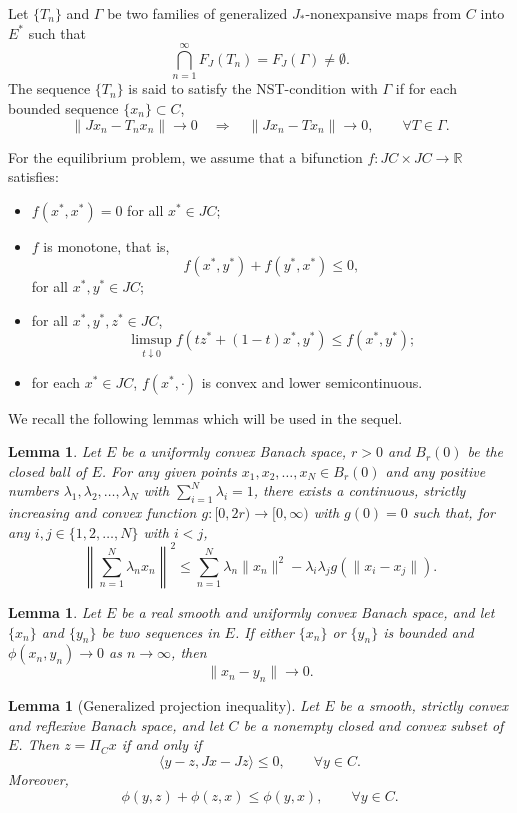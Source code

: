 \documentclass[leqno,12pt]{amsart}
\newtheorem{lemma}[theorem]{Lemma}
\theoremstyle{definition}
\numberwithin{equation}{section}
\begin{document}
 Let $\{T_n\}$ and $\Gamma$ be two families of generalized $J_{*}$-nonexpansive maps from $C$ into $E^{*}$ such that
\[
\bigcap_{n=1}^{\infty}F_J(T_n)=F_J(\Gamma)\neq\emptyset.
\]
The sequence $\{T_n\}$ is said to satisfy the NST-condition with $\Gamma$ if for each bounded sequence $\{x_n\}\subset C$,
\[
\|Jx_n-T_nx_n\|\to 0\quad \Longrightarrow\quad \|Jx_n-Tx_n\|\to 0,\qquad \forall T\in\Gamma.
\]

For the equilibrium problem, we assume that a bifunction $f:JC\times JC\to \mathbb{R}$ satisfies:
\begin{itemize}
\item[(A1)] $f(x^{*},x^{*})=0$ for all $x^{*}\in JC$;
\item[(A2)] $f$ is monotone, that is,
\[
f(x^{*},y^{*})+f(y^{*},x^{*})\leq 0,
\]
for all $x^{*},y^{*}\in JC$;
\item[(A3)] for all $x^{*},y^{*},z^{*}\in JC$,
\[
\limsup_{t\downarrow 0}f(tz^{*}+(1-t)x^{*},y^{*})\leq f(x^{*},y^{*});
\]
\item[(A4)] for each $x^{*}\in JC$, $f(x^{*},\cdot)$ is convex and lower semicontinuous.
\end{itemize}

We recall the following lemmas which will be used in the sequel.

\begin{lemma}\label{glemma}
Let $E$ be a uniformly convex Banach space, $r>0$ and $B_r(0)$ be the closed ball of $E$. For any given points $x_1,x_2,\ldots,x_N\in B_r(0)$ and any positive numbers $\lambda_1,\lambda_2,\ldots,\lambda_N$ with $\sum_{i=1}^{N}\lambda_i=1$, there exists a continuous, strictly increasing and convex function $g:[0,2r)\to [0,\infty)$ with $g(0)=0$ such that, for any $i,j\in\{1,2,\ldots,N\}$ with $i<j$,
\[
\left\|\sum_{n=1}^{N}\lambda_nx_n\right\|^2\leq \sum_{n=1}^{N}\lambda_n\|x_n\|^2-\lambda_i\lambda_jg(\|x_i-x_j\|).
\]
\end{lemma}

\begin{lemma}\label{phitozero}
Let $E$ be a real smooth and uniformly convex Banach space, and let $\{x_n\}$ and $\{y_n\}$ be two sequences in $E$. If either $\{x_n\}$ or $\{y_n\}$ is bounded and $\phi(x_n,y_n)\to 0$ as $n\to\infty$, then
\[
\|x_n-y_n\|\to 0.
\]
\end{lemma}

\begin{lemma}[Generalized projection inequality]\label{projineq}
Let $E$ be a smooth, strictly convex and reflexive Banach space, and let $C$ be a nonempty closed and convex subset of $E$. Then $z=\Pi_Cx$ if and only if
\[
\langle y-z,Jx-Jz\rangle\leq 0,
\qquad \forall y\in C.
\]
Moreover,
\[
\phi(y,z)+\phi(z,x)\leq \phi(y,x),
\qquad \forall y\in C.
\]
\end{lemma}
\end{document}
